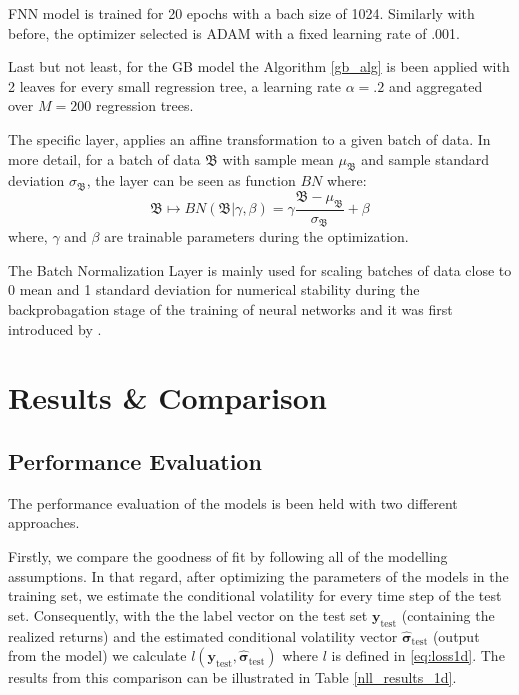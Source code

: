 \documentclass[a4paper, oneside]{discothesis}
\begin{document}
FNN model is trained for 20 epochs with a bach size of 1024. Similarly with before, the optimizer selected is ADAM with a fixed learning rate of .001.

Last but not least, for the GB model the Algorithm \ref{gb_alg} is been applied with 2 leaves for every small regression tree, a learning rate $\alpha = .2$ and aggregated over $M=200$ regression trees.

\begin{mdframed}\begin{remark}\label{BNorm}
The specific layer, applies an affine transformation to a given batch of data. In more detail, for a batch of data $\mathfrak{B}$ with sample mean $\mu_{\mathfrak{B}}$ and sample standard deviation $\sigma_{\mathfrak{B}}$, the layer can be seen as function $BN$ where:
\[
\mathfrak{B}\longmapsto BN(\mathfrak{B}| \gamma, \beta) = \gamma\frac{\mathfrak{B}-\mu_\mathfrak{B}}{\sigma_{\mathfrak{B}}}+\beta
\]
where, $\gamma$ and $\beta$ are trainable parameters during the optimization.

The Batch Normalization Layer is mainly used for scaling batches of data close to 0 mean and 1 standard deviation for numerical stability during the backprobagation stage of the training of neural networks and it was first introduced by \cite{BNorm}.
\end{remark}\end{mdframed}

\section{Results \& Comparison}

\subsection{Performance Evaluation}
The performance evaluation of the models is been held with two different approaches.

Firstly, we compare the goodness of fit by following all of the modelling assumptions. In that regard, after optimizing the parameters of the models in the training set, we estimate the conditional volatility for every time step of the test set. Consequently, with the the label vector on the test set $\mathbf{y}_\text{test}$ (containing the realized returns) and the estimated conditional volatility vector $\boldsymbol{\hat{\sigma}}_\text{test}$ (output from the model) we calculate $l(\mathbf{y}_\text{test}, \boldsymbol{\hat{\sigma}}_\text{test})$ where $l$ is defined in \ref{eq:loss1d}. The results from this comparison can be illustrated in Table \ref{nll_results_1d}. 
\end{document}
